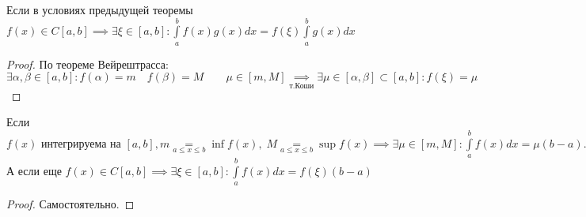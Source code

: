 \documentclass[../main.tex]{subfiles}
\begin{document}
\begin{corollary}
    Если в условиях предыдущей теоремы $f(x) \in C[a,b]\implies \exists \xi \in[a,b] : \int\limits_{a  }^{b    } f(x)g(x)dx=f(\xi)\int\limits_{a  }^{b    } g(x)dx$
\end{corollary}
\begin{proof}
    По теореме Вейрештрасса: $\exists \alpha,\beta\in[a,b]: f(\alpha)=m\quad f(\beta)=M\qquad \mu\in[m,M]\underset{\text{т.Коши}}{\implies} \exists \mu \in[\alpha,\beta]\subset[a,b]:f(\xi)=\mu$
\end{proof}
\begin{corollary}
    Если $f(x)\text{ интегрируема на } [a,b], m\underset{a\leqslant x\leqslant b}{=}\inf{f(x)}, \; M\underset{a\leqslant x\leqslant b}{=}\sup{f(x)}\implies \exists \mu \in [m,M] : \int\limits_{a}^{b} f(x)dx=\mu(b-a).$ А если еще $f(x)\in C [a,b]\implies \exists \xi \in[a,b]: \int\limits_{a  }^{b    } f(x)dx=f(\xi)(b-a)$
\end{corollary}
\begin{proof}
    Самостоятельно.
\end{proof}
\end{document}
